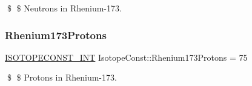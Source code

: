 \$ \$ Neutrons in Rhenium-\/173. \mbox{\label{group___isotope_const-_rhenium-_re173_ga5518bb176503b143c064cb39377e636a}} 
\subsubsection{\texorpdfstring{Rhenium173\+Protons}{Rhenium173Protons}}
{\footnotesize\ttfamily \mbox{\hyperlink{group___isotope_const-_macros_ga5f18360b3e99483a35c32d789e62621c}{I\+S\+O\+T\+O\+P\+E\+C\+O\+N\+S\+T\+\_\+\+I\+NT}} Isotope\+Const\+::\+Rhenium173\+Protons = 75}

\$ \$ Protons in Rhenium-\/173. 